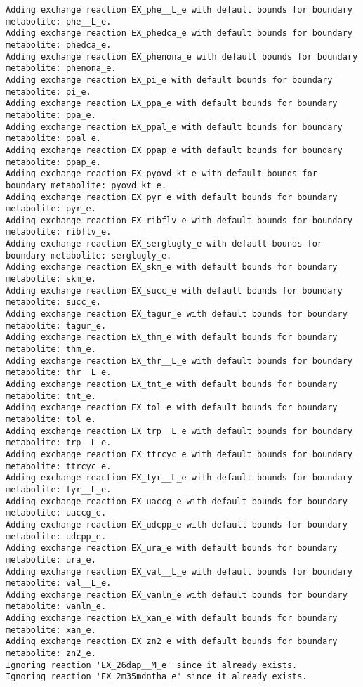\documentclass[
  letterpaper,
  DIV=11,
  numbers=noendperiod]{scrartcl}
\begin{document}
\begin{verbatim}
Adding exchange reaction EX_phe__L_e with default bounds for boundary metabolite: phe__L_e.
Adding exchange reaction EX_phedca_e with default bounds for boundary metabolite: phedca_e.
Adding exchange reaction EX_phenona_e with default bounds for boundary metabolite: phenona_e.
Adding exchange reaction EX_pi_e with default bounds for boundary metabolite: pi_e.
Adding exchange reaction EX_ppa_e with default bounds for boundary metabolite: ppa_e.
Adding exchange reaction EX_ppal_e with default bounds for boundary metabolite: ppal_e.
Adding exchange reaction EX_ppap_e with default bounds for boundary metabolite: ppap_e.
Adding exchange reaction EX_pyovd_kt_e with default bounds for boundary metabolite: pyovd_kt_e.
Adding exchange reaction EX_pyr_e with default bounds for boundary metabolite: pyr_e.
Adding exchange reaction EX_ribflv_e with default bounds for boundary metabolite: ribflv_e.
Adding exchange reaction EX_serglugly_e with default bounds for boundary metabolite: serglugly_e.
Adding exchange reaction EX_skm_e with default bounds for boundary metabolite: skm_e.
Adding exchange reaction EX_succ_e with default bounds for boundary metabolite: succ_e.
Adding exchange reaction EX_tagur_e with default bounds for boundary metabolite: tagur_e.
Adding exchange reaction EX_thm_e with default bounds for boundary metabolite: thm_e.
Adding exchange reaction EX_thr__L_e with default bounds for boundary metabolite: thr__L_e.
Adding exchange reaction EX_tnt_e with default bounds for boundary metabolite: tnt_e.
Adding exchange reaction EX_tol_e with default bounds for boundary metabolite: tol_e.
Adding exchange reaction EX_trp__L_e with default bounds for boundary metabolite: trp__L_e.
Adding exchange reaction EX_ttrcyc_e with default bounds for boundary metabolite: ttrcyc_e.
Adding exchange reaction EX_tyr__L_e with default bounds for boundary metabolite: tyr__L_e.
Adding exchange reaction EX_uaccg_e with default bounds for boundary metabolite: uaccg_e.
Adding exchange reaction EX_udcpp_e with default bounds for boundary metabolite: udcpp_e.
Adding exchange reaction EX_ura_e with default bounds for boundary metabolite: ura_e.
Adding exchange reaction EX_val__L_e with default bounds for boundary metabolite: val__L_e.
Adding exchange reaction EX_vanln_e with default bounds for boundary metabolite: vanln_e.
Adding exchange reaction EX_xan_e with default bounds for boundary metabolite: xan_e.
Adding exchange reaction EX_zn2_e with default bounds for boundary metabolite: zn2_e.
Ignoring reaction 'EX_26dap__M_e' since it already exists.
Ignoring reaction 'EX_2m35mdntha_e' since it already exists.

\end{verbatim}
\end{document}
